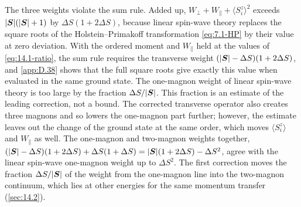 The three weights violate the sum rule. Added up, $W_\perp + W_\parallel + \langle S^z_i\rangle^2$ exceeds $|\bm{S}|(|\bm{S}| + 1)$ by $\Delta S(1 + 2\Delta S)$, because linear spin-wave theory replaces the square roots of the Holstein--Primakoff transformation \cref{eq:7.1-HP} by their value at zero deviation. With the ordered moment and $W_\parallel$ held at the values of \cref{eq:14.1-ratio}, the sum rule requires the transverse weight $(|\bm{S}| - \Delta S)(1 + 2\Delta S)$, and \cref{app:D.38} shows that the full square roots give exactly this value when evaluated in the same ground state. The one-magnon weight of linear spin-wave theory is too large by the fraction $\Delta S/|\bm{S}|$. This fraction is an estimate of the leading correction, not a bound. The corrected transverse operator also creates three magnons and so lowers the one-magnon part further; however, the estimate leaves out the change of the ground state at the same order, which moves $\langle S^z_i\rangle$ and $W_\parallel$ as well. The one-magnon and two-magnon weights together, $(|\bm{S}| - \Delta S)(1 + 2\Delta S) + \Delta S(1 + \Delta S) = |\bm{S}|(1 + 2\Delta S) - \Delta S^2$, agree with the linear spin-wave one-magnon weight up to $\Delta S^2$. The first correction moves the fraction $\Delta S/|\bm{S}|$ of the weight from the one-magnon line into the two-magnon continuum, which lies at other energies for the same momentum transfer (\cref{sec:14.2}).

